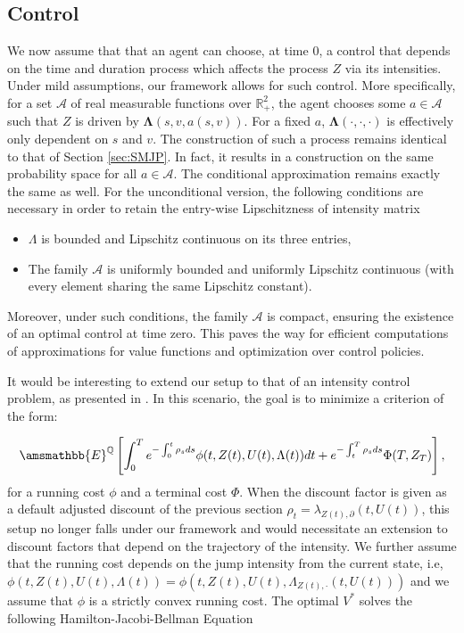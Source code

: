 \documentclass[11pt,leqno]{amsart}
\numberwithin{table}{section}
\numberwithin{figure}{section}
\numberwithin{equation}{section}
\newcommand{\1}{{\mathds{1}}}
\newcommand{\0}{\mat{0}}
\newcommand{\E}{\amsmathbb{E}}
\begin{document}
{\subsection{Control}
\label{sec:control}
We now assume that  that an agent can choose, at time $0$, a control that depends on the time and duration process which affects the process $Z$ via its intensities. 
Under mild assumptions, our framework allows for such control. More specifically, for a set $\mathcal{A}$ of real measurable functions over $\mathds{R}_+^2$, the agent chooses some $a \in \mathcal{A}$ such that $Z$ is driven by $\bm{\Lambda}(s,v, a(s,v))$. For a fixed $a$, $\bm{\Lambda}(\cdot,\cdot,\cdot)$ is effectively only dependent on $s$ and $v$. The construction of such a process remains identical to that of Section \ref{sec:SMJP}. In fact, it results in a construction on the same probability space for all $a \in \mathcal{A}$. The conditional approximation remains exactly the same as well. For the unconditional version,  the following conditions are necessary in order to retain the entry-wise Lipschitzness of intensity matrix

\begin{itemize}
       \item $\Lambda$ is bounded and Lipschitz continuous on its three entries,
       \item The family $\mathcal{A}$ is uniformly bounded and uniformly Lipschitz continuous (with every element sharing the same Lipschitz constant).
\end{itemize}
Moreover, under such conditions, the family $\mathcal{A}$ is compact, ensuring the existence of an optimal control at time zero. This paves the way for efficient computations of approximations for value functions and optimization over control policies.

It would be interesting to extend our setup to that of an intensity control problem, as presented in \cite{bismut1975controle,bremaud1981point}. In this scenario, the goal is to minimize a criterion of the form:

$$\E^{\mathbb Q}\left[ \int_0^T e^{-\int_0^t \rho_s ds } \phi(t, Z(t), U(t), \Lambda(t))dt + e^{-\int_t^T \rho_s ds}\Phi(T, Z_T)\right],$$
for a running cost $\phi$ and a terminal cost $\Phi$.
When  the discount factor is given as a  default adjusted discount of  the previous section  $\rho_t =  \lambda_{Z(t), \partial}(t, U(t))$, this setup no longer falls under our framework and would necessitate an extension to discount factors that depend on the trajectory of the intensity.
We further assume that the running cost depends on the jump intensity from the current state, i.e, 
$\phi(t, Z(t), U(t), \Lambda(t)) = \phi(t, Z(t), U(t), \Lambda_{Z(t), \cdot} (t, U(t)))$ and we assume that $\phi$ is a strictly convex running cost.
The optimal $V^*$ solves the following Hamilton-Jacobi-Bellman Equation

}
\end{document}
